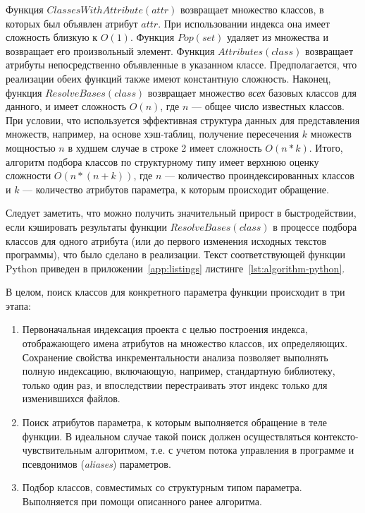 Функция $ClassesWithAttribute(attr)$ возвращает множество классов, в
которых был объявлен атрибут $attr$. При использовании индекса она
имеет сложность близкую к $O(1)$. Функция $Pop(set)$ удаляет из множества
и возвращает его произвольный элемент. Функция $Attributes(class)$ возвращает
атрибуты непосредственно объявленные в указанном классе. Предполагается, что
реализации обеих функций также имеют константную сложность. Наконец, функция
$ResolveBases(class)$ возвращает множество \emph{всех} базовых классов для
данного, и имеет сложность $O(n)$, где $n$ --- общее число известных классов.
При условии, что используется эффективная структура данных для представления
множеств, например, на основе хэш-таблиц, получение пересечения $k$ множеств
мощностью $n$ в худшем случае в строке 2 имеет сложность $O(n*k)$.  Итого,
алгоритм подбора классов по структурному типу имеет верхнюю оценку сложности
$O(n* (n + k))$, где $n$ --- количество проиндексированных классов и $k$ ---
количество атрибутов параметра, к которым происходит обращение.

Следует заметить, что можно получить значительный прирост в быстродействии, если
кэшировать результаты функции $ResolveBases(class)$ в процессе подбора классов
для одного атрибута (или до первого изменения исходных текстов программы), что
было сделано в реализации. Текст соответствующей функции Python приведен в
приложении~\ref{app:listings} листинге~\ref{lst:algorithm-python}.


В целом, поиск классов для конкретного параметра функции происходит в три этапа:

\begin{enumerate}
  \item Первоначальная индексация проекта с целью построения
    индекса, отображающего имена атрибутов на множество классов, их определяющих.
    Сохранение свойства инкрементальности анализа позволяет выполнять полную
    индексацию, включающую, например, стандартную библиотеку, только один раз,
    и впоследствии перестраивать этот индекс только для изменившихся файлов.

  \item Поиск атрибутов параметра, к которым выполняется обращение в теле
    функции. В идеальном случае такой поиск должен осуществляться
    контексто-чувствительным алгоритмом, т.е. с учетом потока управления в
    программе и псевдонимов (\emph{aliases}) параметров.

  \item Подбор классов, совместимых со структурным типом параметра.
    Выполняется при помощи описанного ранее алгоритма.

\end{enumerate}


